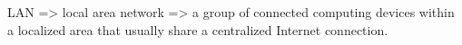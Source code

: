 LAN => local area network => a group of connected computing devices within a localized area that usually share a centralized Internet connection.
